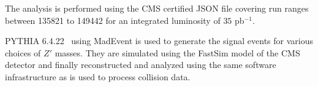 The analysis is performed using the CMS certified JSON file covering run ranges
between 135821 to 149442 for an integrated luminosity of $35$ pb$^{-1}$. 

PYTHIA 6.4.22~\cite{pythia64} using MadEvent is used to generate the signal events for various choices of
$Z'$ masses. They are simulated using the FastSim model of the CMS detector and finally reconstructed 
and analyzed using the same software infrastructure as is used to process collision data.
